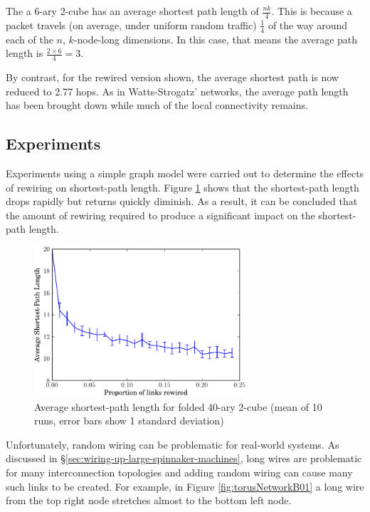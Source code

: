 			The a 6-ary 2-cube has an average shortest path length of $\frac{nk}{4}$.
			This is because a packet travels (on average, under uniform random
			traffic) $\frac{1}{4}$ of the way around each of the $n$, $k$-node-long
			dimensions. In this case, that means the average path length is $\frac{2
			\times 6}{4} = 3$.
			
			By contrast, for the rewired version shown, the average shortest path is
			now reduced to 2.77 hops. As in Watts-Strogatz' networks, the average path
			length has been brought down while much of the local connectivity remains.
		
		
		\subsection{Experiments}
			
			Experiments using a simple graph model were carried out to determine the
			effects of rewiring on shortest-path length. Figure
			\ref{fig:smallWorldTorus} shows that the shortest-path length drops
			rapidly but returns quickly diminish. As a result, it can be concluded
			that the amount of rewiring required to produce a significant impact on
			the shortest-path length.
			
			\begin{figure}
				\center
				\includegraphics[width=0.7\textwidth]{figures/smallWorldTorus}
				\caption{Average shortest-path length for folded 40-ary 2-cube (mean of
				10 runs, error bars show 1 standard deviation)}
				\label{fig:smallWorldTorus}
			\end{figure}
			
			Unfortunately, random wiring can be problematic for real-world systems.
			As discussed in \S\ref{sec:wiring-up-large-spinnaker-machines}, long wires
			are problematic for many interconnection topologies and adding random
			wiring can cause many such links to be created. For example, in Figure
			\ref{fig:torusNetworkB01} a long wire from the top right node stretches
			almost to the bottom left node.
			
